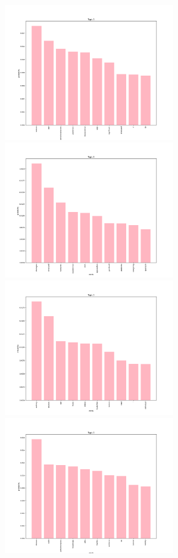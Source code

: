 \documentclass[10pt]{article} %
\begin{document}
\begin{center}
		\includegraphics[width=7.5cm]{images/plots/test_5_no_stopwords_dataset_2/topic_3.png}\
		\includegraphics[width=7.5cm]{images/plots/test_5_no_stopwords_dataset_2/topic_4.png}
		\includegraphics[width=7.5cm]{images/plots/test_5_no_stopwords_dataset_2/topic_5.png}
		\includegraphics[width=7.5cm]{images/plots/test_5_no_stopwords_dataset_2/topic_6.png}

\end{center}
\end{document}
